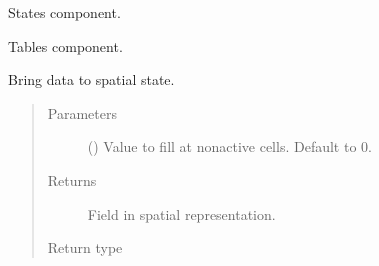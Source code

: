 \documentclass[letterpaper,10pt,english]{sphinxmanual}
\begin{document}
\begin{fulllineitems}
\begin{fulllineitems}
\end{fulllineitems}


\begin{fulllineitems}
\label{\detokenize{api/field:geology.src.Field.states}}
States component.

\end{fulllineitems}


\begin{fulllineitems}
\label{\detokenize{api/field:geology.src.Field.tables}}
Tables component.

\end{fulllineitems}


\begin{fulllineitems}
\label{\detokenize{api/field:geology.src.Field.to_spatial}}
Bring data to spatial state.
\begin{quote}\begin{description}
\item[{Parameters}] \leavevmode
{} () \textendash{} Value to fill at non\sphinxhyphen{}active cells. Default to 0.

\item[{Returns}] \leavevmode
{} \textendash{} Field in spatial representation.

\item[{Return type}] \leavevmode
{\hyperref[\detokenize{api/field:geology.src.Field}]{}}

\end{description}\end{quote}

\end{fulllineitems}



\end{fulllineitems}
\end{document}
